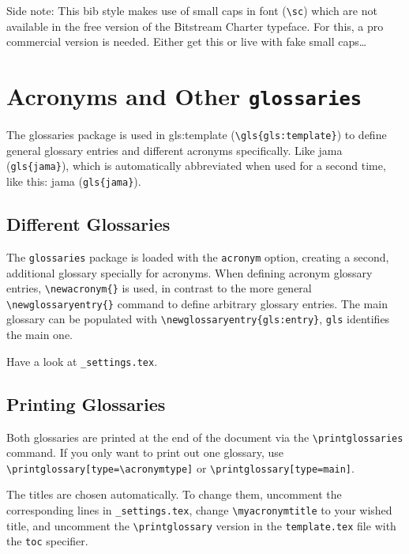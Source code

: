 Side note: This bib style makes use of small caps in font (\verb|\sc|) which are not available in the free version of the Bitstream Charter typeface. For this, a pro commercial version is needed. Either get this or live with fake small caps\ldots


\section{Acronyms and Other \texttt{glossaries}} %
\label{sec:glossaries}

The glossaries package is used in \gls{gls:template} (\verb|\gls{gls:template}|) to define general glossary entries and different acronyms specifically. Like \gls{jama} (\verb|gls{jama}|), which is automatically abbreviated when used for a second time, like this: \gls{jama} (\verb|gls{jama}|).

\subsection{Different Glossaries} %
\label{sub:different_glossaries_acronyms_and_titles}
The \texttt{glossaries} package is loaded with the \texttt{acronym} option, creating a second, additional glossary specially for acronyms. When defining acronym glossary entries, \verb|\newacronym{}| is used, in contrast to the more general \verb|\newglossaryentry{}| command to define arbitrary glossary entries. The main glossary can be populated with \verb|\newglossaryentry{gls:entry}|, \texttt{gls} identifies the main one.

Have a look at \verb|_settings.tex|.

\subsection{Printing Glossaries} %
\label{sub:printing_glossaries}
Both glossaries are printed at the end of the document via the \verb|\printglossaries| command. If you only want to print out one glossary, use \verb|\printglossary[type=\acronymtype]| or \verb|\printglossary[type=main]|.

The titles are chosen automatically. To change them, uncomment the corresponding lines in \verb|_settings.tex|, change \verb|\myacronymtitle| to your wished title, and uncomment the \verb|\printglossary| version in the \texttt{template.tex} file with the \texttt{toc} specifier.


